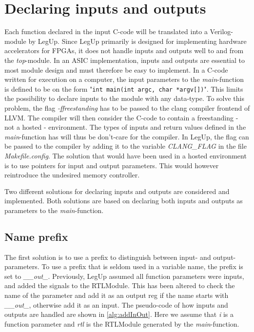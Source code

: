 \section{\label{subsec:inoutdecl}Declaring inputs and outputs}
Each function declared in the input C-code will be translated into a Verilog-module by LegUp. Since LegUp primarily is designed for implementing hardware accelerators for FPGAs, it does not handle inputs and outputs well to and from the \textit{top}-module. In an ASIC implementation, inputs and outputs are essential to most module design and must therefore be easy to implement. In a C-code written for execution on a computer, the input parameters to the \textit{main}-function is defined to be on the form "\verb!int main(int argc, char *argv[])!". This limits the possibility to declare inputs to the module with any data-type. To solve this problem, the flag \textit{-ffreestanding} has to be passed to the clang compiler frontend of LLVM. The compiler will then consider the C-code to contain a freestanding - not a hosted - environment. The types of inputs and return values defined in the \textit{main}-function has will thus be don't-care for the compiler. In LegUp, the flag can be passed to the compiler by adding it to the variable \textit{CLANG\_FLAG} in the file \textit{Makefile.config}. The solution that would have been used in a hosted environment is to use pointers for input and output parameters. This would however reintroduce the undesired memory controller.

Two different solutions for declaring inputs and outputs are considered and implemented. Both solutions are based on declaring both inputs and outputs as parameters to the \textit{main}-function.
\subsection{\label{subsec:inoutprefix}Name prefix}
The first solution is to use a prefix to distinguish between input- and output-parameters. To use a prefix that is seldom used in a variable name, the prefix is set to \textit{\_\_out\_}. Previously, LegUp assumed all function parameters were inputs, and added the signals to the RTLModule. This has been altered to check the name of the parameter and add it as an output reg if the name starts with \textit{\_\_out\_}, otherwise add it as an input. The pseudo-code of how inputs and outputs are handled are shown in \cref{alg:addInOut}. Here we assume that \textit{i} is a function parameter and \textit{rtl} is the RTLModule generated by the \textit{main}-function.

